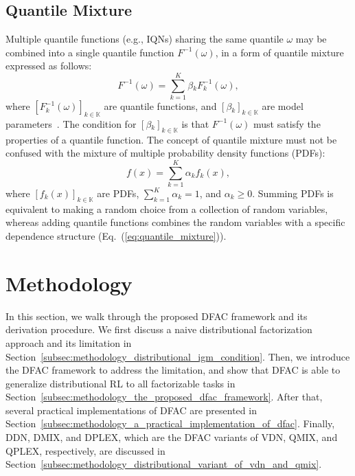 \documentclass[twoside,11pt]{article}
\newcommand{\agentspace}{\mathbb{K}}
\newcommand{\agentcounter}{k}
\newcommand{\numberofagents}{K}
\newcommand{\quantilefunction}{F^{-1}}
\newcommand{\quantile}{\omega}
\newcommand{\pdf}{f}
\newcommand{\pdfmodelparameter}{\alpha}
\newcommand{\modelparameter}{\beta}
\newcommand{\ddn}{DDN}
\newcommand{\dmix}{DMIX}
\newcommand{\dplex}{DPLEX}
\begin{document}
\subsection{Quantile Mixture}
\label{subsec:background_quantile_mixture}

Multiple quantile functions (e.g., IQNs) sharing the same quantile $\quantile{}$ may be combined into a single quantile function $\quantilefunction{}(\quantile{})$, in a form of quantile mixture expressed as follows:
\begin{equation}
\quantilefunction{}(\quantile{})=\sum^{\numberofagents{}}_{k=1}\modelparameter{}_{\agentcounter{}} \quantilefunction_{\agentcounter{}}(\quantile{}),
\label{eq:quantile_mixture}
\end{equation}
where $[\quantilefunction_{\agentcounter{}}(\quantile{})]_{\agentcounter{}\in\agentspace{}}$ are quantile functions, and $[\modelparameter{}_{\agentcounter{}}]_{\agentcounter{}\in\agentspace{}}$ are model parameters~\citep{Karvanen2006QuantileMixture}. The condition for  $[\modelparameter{}_{\agentcounter{}}]_{\agentcounter{}\in\agentspace{}}$ is that $\quantilefunction{}(\quantile{})$ must satisfy the properties of a quantile function.
The concept of quantile mixture must not be confused with the mixture of multiple probability density functions (PDFs):
\begin{equation}
\pdf{}(x)=\sum^{\numberofagents{}}_{\agentcounter{}=1}\pdfmodelparameter{}_{\agentcounter{}} \pdf{}_{\agentcounter{}}(x),
\end{equation}
where $[\pdf{}_{\agentcounter{}}(x)]_{\agentcounter{}\in\agentspace{}}$ are PDFs, $\sum^{\numberofagents{}}_{\agentcounter{}=1}\pdfmodelparameter{}_{\agentcounter{}}=1$, and $\pdfmodelparameter{}_{\agentcounter{}}\ge 0$. Summing PDFs is equivalent to making a random choice from a collection of random variables, whereas adding quantile functions combines the random variables with a specific dependence structure (Eq.~(\ref{eq:quantile_mixture})).
 \section{Methodology}
\label{sec:methodology}

In this section, we walk through the proposed DFAC framework and its derivation procedure. We first discuss a naive distributional factorization approach and its limitation in Section~\ref{subsec:methodology_distributional_igm_condition}.
Then, we introduce the DFAC framework to address the limitation, and show that DFAC is able to generalize distributional RL to all factorizable tasks in Section~\ref{subsec:methodology_the_proposed_dfac_framework}.
After that, several practical implementations of DFAC are presented in Section~\ref{subsec:methodology_a_practical_implementation_of_dfac}.
Finally, \ddn{}, \dmix{}, and \dplex{}, which are the DFAC variants of VDN, QMIX, and QPLEX, respectively, are discussed in Section~\ref{subsec:methodology_distributional_variant_of_vdn_and_qmix}.
\end{document}
